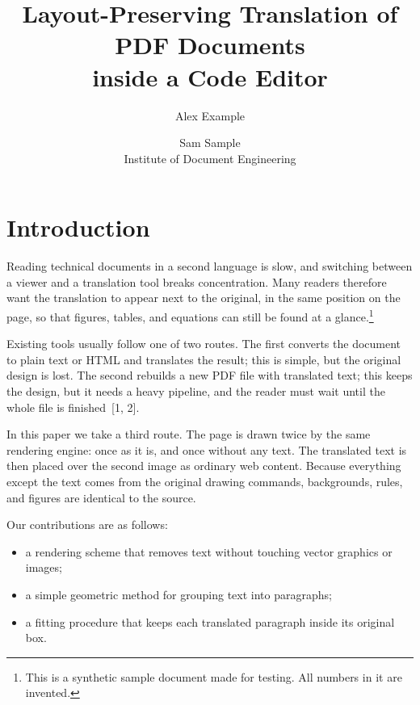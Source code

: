 \documentclass[10pt,twocolumn]{article}
\title{\bfseries Layout-Preserving Translation of PDF Documents\\ inside a Code Editor}
\author{Alex Example \and Sam Sample\\[2pt] \small Institute of Document Engineering}
\date{}
\begin{document}

\section{Introduction}
Reading technical documents in a second language is slow, and switching between a
viewer and a translation tool breaks concentration. Many readers therefore want the
translation to appear next to the original, in the same position on the page, so that
figures, tables, and equations can still be found at a
glance.\footnote{This is a synthetic sample document made for testing. All numbers in it are invented.}

Existing tools usually follow one of two routes. The first converts the document to
plain text or HTML and translates the result; this is simple, but the original design
is lost. The second rebuilds a new PDF file with translated text; this keeps the
design, but it needs a heavy pipeline, and the reader must wait until the whole file is
finished~[1, 2].

In this paper we take a third route. The page is drawn twice by the same rendering
engine: once as it is, and once without any text. The translated text is then placed
over the second image as ordinary web content. Because everything except the text
comes from the original drawing commands, backgrounds, rules, and figures are
identical to the source.

Our contributions are as follows:
\begin{itemize}
\item a rendering scheme that removes text without touching vector graphics or images;
\item a simple geometric method for grouping text into paragraphs;
\item a fitting procedure that keeps each translated paragraph inside its original box.
\end{itemize}
\end{document}

